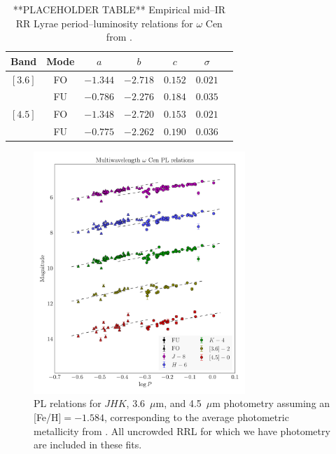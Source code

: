 \documentclass[a4paper,fleqn,usenatbib]{mnras}
\begin{document}
\begin{table}
\centering
\caption{**PLACEHOLDER TABLE** Empirical mid--IR RR Lyrae period--luminosity relations for $\omega$ Cen from \citet{2015arXiv150507858N}.} 
\label{tab:pl_table_m4}
\begin{tabular}{l|c|c|c|c|c|r} 
\hline \hline
Band & Mode & $a$   & $b$   & $c$   & $\sigma$ \\
\hline
$[3.6]$ & FO & $-1.344$ & $-2.718$ & $0.152$ & $0.021$ \\
            & FU & $-0.786$ & $-2.276$ & $0.184$ & $0.035$ \\
$[4.5]$ & FO & $-1.348$ & $-2.720$ & $0.153$ & $0.021$ \\         
            & FU & $-0.775$ & $-2.262$ & $0.190$ & $0.036$ \\
            \hline
\end{tabular}
\end{table}

\begin{figure}
\begin{center}
\includegraphics[width=80mm]{final_plots/multiwavelength_PL_allstars_phot.pdf}
\caption{PL relations for $J\!H\!K$, 3.6~$\mu$m, and 4.5~$\mu$m photometry assuming an [Fe/H]$=-1.584$, corresponding to the average photometric metallicity from \citet{2000AJ....119.1824R}. All uncrowded RRL for which we have photometry are included in these fits.}
\label{fig:omegaCen_pl_allstars}
\end{center}
\end{figure}
\end{document}
